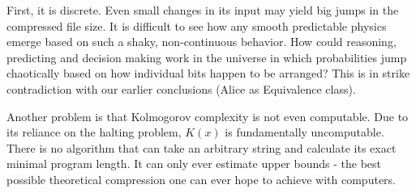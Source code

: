 First, it is discrete. Even small changes in its input may yield big jumps in the compressed file size. It is difficult to see how any smooth predictable physics emerge based on such a shaky,
non-continuous behavior. How could reasoning, predicting and decision making work in the universe in which probabilities jump chaotically based on how individual bits happen to be arranged?
This is in strike contradiction with our earlier conclusions (Alice as Equivalence class).

Another problem is that Kolmogorov complexity is not even computable.
Due to its reliance on the halting problem, $K(x)$ is fundamentally uncomputable.
There is no algorithm that can take an arbitrary string and calculate its exact minimal program length.
It can only ever estimate upper bounds - the best possible theoretical compression one can ever hope to achieve with computers. 

